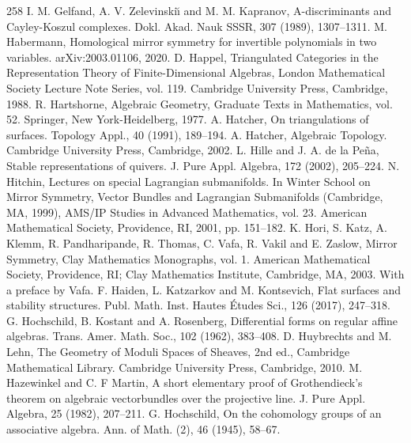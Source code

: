 \begin{thebibliography}{258}
\hypertarget{ref:106}{} I. M. Gelfand, A. V. Zelevinskiı̆ and M. M. Kapranov, A-discriminants and Cayley-Koszul complexes. Dokl. Akad. Nauk SSSR, 307 (1989), 1307–1311.
\hypertarget{ref:107}{} M. Habermann, Homological mirror symmetry for invertible polynomials in two variables. arXiv:2003.01106, 2020.
\hypertarget{ref:108}{} D. Happel, Triangulated Categories in the Representation Theory of Finite-Dimensional Algebras, London Mathematical Society Lecture Note Series, vol. 119. Cambridge University Press, Cambridge, 1988.
\hypertarget{ref:109}{} R. Hartshorne, Algebraic Geometry, Graduate Texts in Mathematics, vol. 52. Springer, New York-Heidelberg, 1977.
\hypertarget{ref:110}{} A. Hatcher, On triangulations of surfaces. Topology Appl., 40 (1991), 189–194.
\hypertarget{ref:111}{} A. Hatcher, Algebraic Topology. Cambridge University Press, Cambridge, 2002.
\hypertarget{ref:112}{} L. Hille and J. A. de la Peña, Stable representations of quivers. J. Pure Appl. Algebra, 172 (2002), 205–224.
\hypertarget{ref:113}{} N. Hitchin, Lectures on special Lagrangian submanifolds. In Winter School on Mirror Symmetry, Vector Bundles and Lagrangian Submanifolds (Cambridge, MA, 1999), AMS/IP Studies in Advanced Mathematics, vol. 23. American Mathematical Society, Providence, RI, 2001, pp. 151–182.
\hypertarget{ref:114}{} K. Hori, S. Katz, A. Klemm, R. Pandharipande, R. Thomas, C. Vafa, R. Vakil and E. Zaslow, Mirror Symmetry, Clay Mathematics Monographs, vol. 1. American Mathematical Society, Providence, RI; Clay Mathematics Institute, Cambridge, MA, 2003. With a preface by Vafa.
\hypertarget{ref:115}{} F. Haiden, L. Katzarkov and M. Kontsevich, Flat surfaces and stability structures. Publ. Math. Inst. Hautes Études Sci., 126 (2017), 247–318.
\hypertarget{ref:116}{} G. Hochschild, B. Kostant and A. Rosenberg, Differential forms on regular affine algebras. Trans. Amer. Math. Soc., 102 (1962), 383–408.
\hypertarget{ref:117}{} D. Huybrechts and M. Lehn, The Geometry of Moduli Spaces of Sheaves, 2nd ed., Cambridge Mathematical Library. Cambridge University Press, Cambridge, 2010.
\hypertarget{ref:118}{} M. Hazewinkel and C. F Martin, A short elementary proof of Grothendieck’s theorem on algebraic vectorbundles over the projective line. J. Pure Appl. Algebra, 25 (1982), 207–211.
\hypertarget{ref:119}{} G. Hochschild, On the cohomology groups of an associative algebra. Ann. of Math. (2), 46 (1945), 58–67.

\end{thebibliography}

